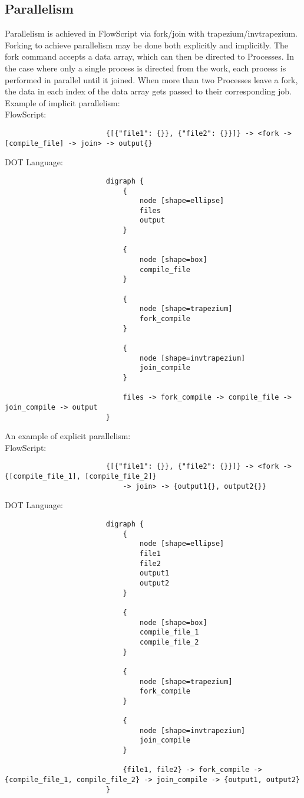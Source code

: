 \documentclass{article}
\begin{document}
			\subsection{Parallelism}
				Parallelism is achieved in FlowScript via fork/join with trapezium/invtrapezium. Forking to achieve parallelism may be done both explicitly and implicitly. The fork command accepts a data array, which can then be directed to Processes. In the case where only a single process is directed from the work, each process is performed in parallel until it joined. When more than two Processes leave a fork, the data in each index of the data array gets passed to their corresponding job. Example of implicit parallelism: \\
					FlowScript:
					\begin{verbatim}
						{[{"file1": {}}, {"file2": {}}]} -> <fork -> [compile_file] -> join> -> output{}
					\end{verbatim}
					DOT Language:
					\begin{verbatim}
						digraph {
						    {
						        node [shape=ellipse]
						        files
						        output
						    }

						    {
						        node [shape=box]
						        compile_file
						    }
    
						    {
						        node [shape=trapezium]
						        fork_compile
						    }

						    {
						        node [shape=invtrapezium]
						        join_compile
						    }

						    files -> fork_compile -> compile_file -> join_compile -> output
						}
					\end{verbatim}
				An example of explicit parallelism: \\
					FlowScript:
					\begin{verbatim}
						{[{"file1": {}}, {"file2": {}}]} -> <fork -> {[compile_file_1], [compile_file_2]} 
							-> join> -> {output1{}, output2{}}
					\end{verbatim}
					DOT Language:
					\begin{verbatim}
						digraph {
						    {
						        node [shape=ellipse]
						        file1
						        file2
						        output1
						        output2
						    }

						    {
						        node [shape=box]
						        compile_file_1
						        compile_file_2
						    }
    
						    {
						        node [shape=trapezium]
						        fork_compile
						    }

						    {
						        node [shape=invtrapezium]
						        join_compile
						    }

						    {file1, file2} -> fork_compile -> {compile_file_1, compile_file_2} -> join_compile -> {output1, output2}
						}
					\end{verbatim}
\end{document}
